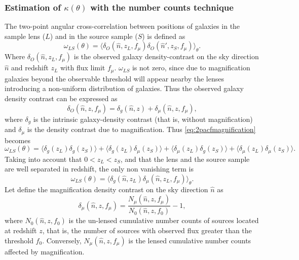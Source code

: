 \subsubsection{Estimation of $\kappa(\theta)$ with the number counts technique}
The two-point angular cross-correlation between positions of galaxies in the sample lens ($L$) and in the source sample ($S$) is defined as \cite{PhysRevD.77.023512,}
\begin{equation}
\omega_{LS}(\theta) = \langle\delta_O(\hat n,z_L,f_\mu)\delta_O(\hat n',z_S,f_\mu)\rangle_{\theta}.
\label{eq:2pacfmagnification}
\end{equation}
Where $\delta_O(\hat n,z_L,f_\mu)$ is the observed galaxy density-contrast on the sky direction $\hat n$ and redshift $z_L$ with flux limit $f_\mu$. $\omega_{LS}$ is not zero, since due to magnification galaxies beyond the observable threshold will appear nearby the lenses introducing a non-uniform distribution of galaxies. Thus the observed galaxy density contrast can be expressed as
\begin{equation}
\delta_O(\hat n,z,f_\mu) = \delta_g(\hat n,z)+\delta_\mu(\hat n,z,f_\mu),
\end{equation}
where $\delta_g$ is the intrinsic galaxy-density contrast (that is, without magnification) and $\delta_\mu$ is the density contrast due to magnification. Thus \autoref{eq:2pacfmagnification} becomes
\begin{equation}
\omega_{LS}(\theta) = \langle\delta_g(z_L)\delta_g(z_S)\rangle+\langle\delta_g(z_L)\delta_\mu(z_S)\rangle+\langle\delta_\mu(z_L)\delta_g(z_S)\rangle+\langle\delta_\mu(z_L)\delta_\mu(z_S)\rangle.
\label{eq:4t}
\end{equation}
Taking into account that $0<z_L<z_S$, and that the lens and the source sample are well separated in redshift, the only non vanishing term is
\begin{equation}
\omega_{LS}(\theta) = \langle\delta_g(\hat n,z_L)\delta_\mu(\hat n,z_L,f_\mu)\rangle_\theta.
\end{equation}
Let define the magnification density contrast on the sky direction $\hat n$ as 
\begin{equation}
\delta_\mu(\hat n,z,f_\mu) = \frac{N_\mu(\hat n,z,f_\mu)}{N_0(\hat n,z,f_0)}-1,
\end{equation}
where $N_0(\hat n,z,f_0)$ is the un-lensed cumulative number counts of sources located at redshift $z$, that is, the number of sources with observed flux greater than the threshold $f_0$. Conversely, $N_\mu(\hat n,z,f_\mu)$ is the lensed cumulative number counts affected by magnification.
\newline

